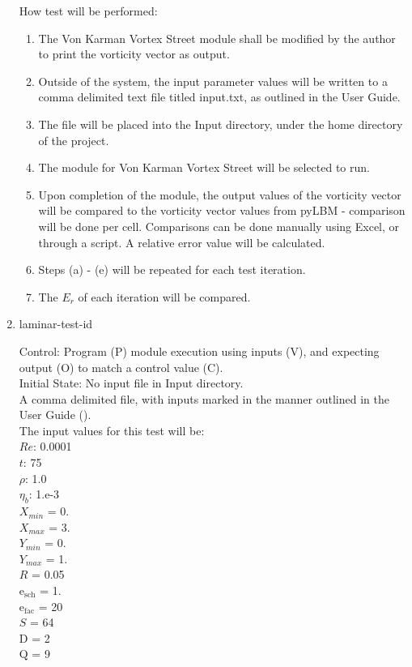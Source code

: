 \documentclass[12pt, titlepage]{article}
\newcounter{testcounter} %
\begin{document}
\begin{enumerate}
How test will be performed: 

\begin{enumerate}
\item The Von Karman Vortex Street module shall be modified by the author to
  print the vorticity vector as output.
\item Outside of the system, the input parameter values will be written to a
  comma delimited text file titled input.txt, as outlined in the User Guide.
\item The file will be placed into the Input directory, under the home directory
  of the project.
\item The module for Von Karman Vortex Street will be selected to run.
\item Upon completion of the module, the output values of the vorticity vector
  will be compared to the vorticity vector values from pyLBM - comparison will
  be done per cell. Comparisons can be done manually using Excel, or through a
  script. A relative error value will be calculated.
\item Steps (a) - (e) will be repeated for each test iteration.
\item The $E_r$ of each iteration will be compared.
\end{enumerate}
					
\item{laminar-test-id\thetestcounter \\}

Control: Program (P) module execution using inputs (V), and expecting output (O)
to match a control value (C).\\
					
Initial State: No input file in Input directory.\\
					
A comma delimited file, with inputs marked in the manner outlined in the User
Guide (\citet{LBM_UserGuide_PM}).\\The input values for this test will be:\\
$Re$: 0.0001\\
$t$: 75\\
$\rho$: 1.0\\
$\eta_b$: 1.e-3\\
$X_{min}$ = 0.\\
$X_{max}$ = 3.\\
$Y_{min}$ = 0.\\
$Y_{max}$ = 1.\\
$R$ = 0.05\\
$\mathrm{e_{sch}}$ = 1.\\
$\mathrm{e_{fac}}$ = 20\\
$S$ = 64\\
$\mathrm{D}$ = 2\\
$\mathrm{Q}$ = 9\\
					

\end{enumerate}
\end{document}
